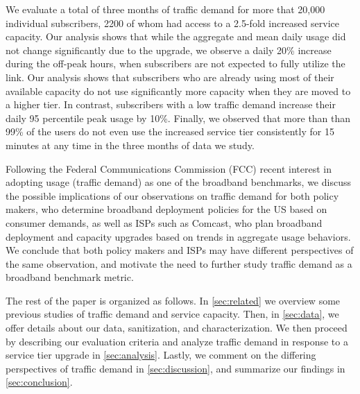 We evaluate a total of three months of traffic demand for more that 20,000 
individual subscribers, 2200 of whom had access to a 2.5-fold increased 
service capacity. Our analysis shows that while the aggregate and mean daily 
usage did not change significantly due to the upgrade, we observe a daily 20\% 
increase during the off-peak hours, when subscribers are not expected to fully 
utilize the link.
Our analysis shows that subscribers who are already using most of their 
available capacity do not use significantly more capacity when they are 
moved to a higher tier. In contrast, subscribers with a low traffic demand 
increase their daily 95 percentile peak usage by 10\%. Finally, we observed 
that more than than 99\% of the users do not even use the increased service 
tier consistently for 15 minutes at any time in the three months of data we 
study.

Following the Federal Communications Commission (FCC) recent interest in 
adopting usage (traffic demand) as one of the broadband benchmarks, we discuss 
the possible implications of our observations on traffic demand for both policy 
makers, who determine broadband deployment policies for the US based on consumer 
demands, as well as ISPs such as Comcast, who plan broadband deployment and 
capacity upgrades based on trends in aggregate usage behaviors. We conclude that 
both policy makers and ISPs may have different perspectives of the same 
observation, and motivate the need to further study traffic demand as a 
broadband benchmark metric.

The rest of the paper is organized as follows. In \autoref{sec:related} we 
overview some previous studies of traffic demand and service capacity. Then, in 
\autoref{sec:data}, we offer details about our data, sanitization, and 
characterization. We then proceed by describing our evaluation criteria and 
analyze traffic demand in response to a service tier upgrade in 
\autoref{sec:analysis}.
Lastly, we comment on the differing perspectives of traffic demand in 
\autoref{sec:discussion}, and summarize our findings in 
\autoref{sec:conclusion}.
